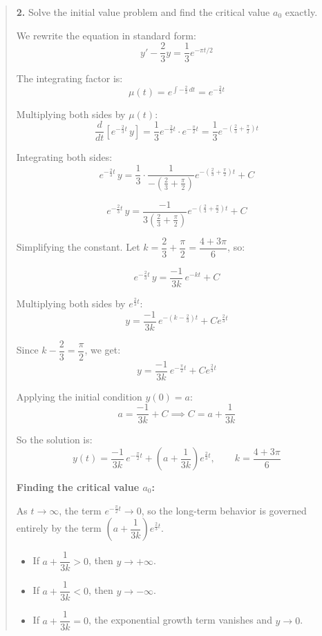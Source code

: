 \begin{quote}
\begin{respuesta}
\textbf{2. }Solve the initial value problem and find the critical value $a_0$ exactly.

We rewrite the equation in standard form:
\[
y' - \frac{2}{3}y = \frac{1}{3}e^{-\pi t/2}
\]

The integrating factor is:
\[
\mu(t) = e^{\int -\frac{2}{3}\,dt} = e^{-\frac{2}{3}t}
\]

Multiplying both sides by $\mu(t)$:
\[
\frac{d}{dt}\left[e^{-\frac{2}{3}t}\,y\right] = \frac{1}{3}e^{-\frac{2}{3}t}\cdot e^{-\frac{\pi}{2}t} = \frac{1}{3}e^{-\left(\frac{2}{3}+\frac{\pi}{2}\right)t}
\]

Integrating both sides:
\[
e^{-\frac{2}{3}t}\,y = \frac{1}{3} \cdot \frac{1}{-\left(\frac{2}{3}+\frac{\pi}{2}\right)}e^{-\left(\frac{2}{3}+\frac{\pi}{2}\right)t} + C
\]

\[
e^{-\frac{2}{3}t}\,y = \frac{-1}{3\left(\frac{2}{3}+\frac{\pi}{2}\right)}e^{-\left(\frac{2}{3}+\frac{\pi}{2}\right)t} + C
\]

Simplifying the constant. Let $k = \dfrac{2}{3}+\dfrac{\pi}{2} = \dfrac{4+3\pi}{6}$, so:

\[
e^{-\frac{2}{3}t}\,y = \frac{-1}{3k}\,e^{-kt} + C
\]

Multiplying both sides by $e^{\frac{2}{3}t}$:
\[
y = \frac{-1}{3k}\,e^{-\left(k-\frac{2}{3}\right)t} + Ce^{\frac{2}{3}t}
\]

Since $k - \dfrac{2}{3} = \dfrac{\pi}{2}$, we get:
\[
y = \frac{-1}{3k}\,e^{-\frac{\pi}{2}t} + Ce^{\frac{2}{3}t}
\]

Applying the initial condition $y(0) = a$:
\[
a = \frac{-1}{3k} + C \implies C = a + \frac{1}{3k}
\]

So the solution is:
\[
\boxed{y(t) = \frac{-1}{3k}\,e^{-\frac{\pi}{2}t} + \left(a + \frac{1}{3k}\right)e^{\frac{2}{3}t}}, \qquad k = \frac{4+3\pi}{6}
\]

\textbf{Finding the critical value $a_0$:}

As $t \to \infty$, the term $e^{-\frac{\pi}{2}t} \to 0$, so the long-term behavior is governed entirely by the term $\left(a + \dfrac{1}{3k}\right)e^{\frac{2}{3}t}$.

\begin{itemize}
    \item If $a + \dfrac{1}{3k} > 0$, then $y \to +\infty$.
    \item If $a + \dfrac{1}{3k} < 0$, then $y \to -\infty$.
    \item If $a + \dfrac{1}{3k} = 0$, the exponential growth term vanishes and $y \to 0$.
\end{itemize}


\end{respuesta}
\end{quote}
